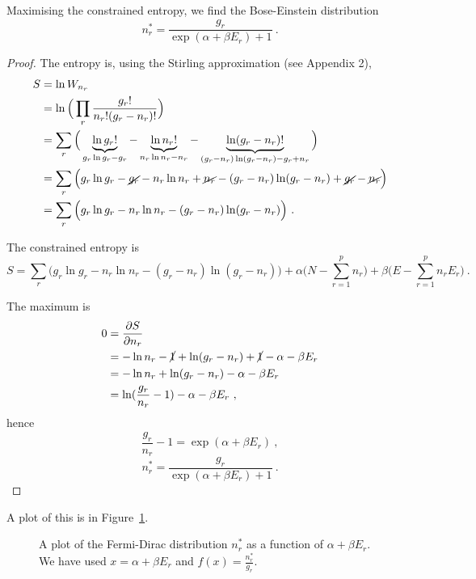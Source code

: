     Maximising the constrained entropy, we find the Bose-Einstein distribution 
    \begin{equation*}
        n_r^* = \frac{g_r}{\exp(\alpha + \beta E_r) + 1} ~.
    \end{equation*}
    \begin{proof}
        The entropy is, using the Stirling approximation (see Appendix 2),
        \begin{equation*}
        \begin{aligned}
            S & = \ln W_{n_r} \\ & = \ln \Big (\prod_r \frac{g_r!}{n_r! (g_r - n_r)!} \Big) \\ & = \sum_r \Big ( \underbrace{\ln g_r!}_{g_r \ln g_r - g_r} - \underbrace{\ln n_r!}_{n_r \ln n_r - n_r} - \underbrace{\ln (g_r - n_r)!}_{(g_r - n_r) \ln (g_r - n_r) - g_r + n_r} \Big) \\ & = \sum_r \Big ( g_r \ln g_r - \cancel{g_r} - n_r \ln n_r + \cancel{n_r} - (g_r - n_r) \ln (g_r - n_r) + \cancel{g_r} - \cancel{n_r} \Big) \\ & = \sum_r \Big ( g_r \ln g_r - n_r \ln n_r - (g_r - n_r) \ln (g_r - n_r) \Big) 
             ~.
        \end{aligned}
        \end{equation*}
    
        The constrained entropy is
        \begin{equation*}
            S =  \sum_r \Big ( g_r \ln g_r - n_r \ln n_r - (g_r - n_r) \ln (g_r - n_r) \Big) + \alpha \Big (N - \sum_{r=1}^p n_r \Big) + \beta \Big (E - \sum_{r=1}^p n_r E_r \Big ) ~.
        \end{equation*}
    
        The maximum is 
        \begin{equation*}
        \begin{aligned}
            0 & = \frac{\partial S}{\partial n_r} \\ & = - \ln n_r - \cancel{1} + \ln (g_r - n_r) + \cancel{1} - \alpha - \beta E_r \\ & = - \ln n_r + \ln (g_r - n_r) - \alpha - \beta E_r \\ & = \ln (\frac{g_r}{n_r} - 1) - \alpha - \beta E_r~ ,
        \end{aligned}
        \end{equation*}
        hence 
        \begin{equation*}
            \frac{g_r}{n_r} - 1 = \exp(\alpha + \beta E_r) ~,
        \end{equation*}
        \begin{equation*}
            n_r^* = \frac{g_r}{\exp(\alpha + \beta E_r) + 1} ~.
        \end{equation*}
    \end{proof}
    A plot of this is in Figure~\ref{en:fd}.
    \begin{figure}
        \centering
        \caption{A plot of the Fermi-Dirac distribution $n_r^*$ as a function of $\alpha + \beta E_r$. We have used $x = \alpha + \beta E_r $ and $f(x) = \frac{n_r^*}{g_r}$.}
        \label{en:fd}
    \end{figure}

